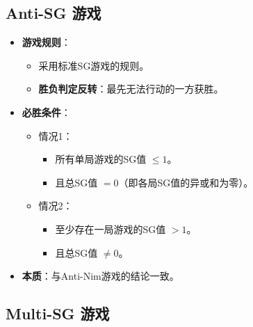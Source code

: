 \documentclass[a4paper,12pt]{article}
\begin{document}
\subsection{Anti-SG 游戏}

\begin{itemize}
    \item \textbf{游戏规则}：
    \begin{itemize}
        \item 采用标准SG游戏的规则。
        \item \textbf{胜负判定反转}：最先无法行动的一方获胜。
    \end{itemize}
    
    \item \textbf{必胜条件}：
    \begin{itemize}
        \item 情况1：
        \begin{itemize}
            \item 所有单局游戏的SG值 $\leq 1$。
            \item 且总SG值 $= 0$（即各局SG值的异或和为零）。
        \end{itemize}
        
        \item 情况2：
        \begin{itemize}
            \item 至少存在一局游戏的SG值 $> 1$。
            \item 且总SG值 $\neq 0$。
        \end{itemize}
    \end{itemize}
    
    \item \textbf{本质}：与Anti-Nim游戏的结论一致。
\end{itemize}

\subsection{Multi-SG 游戏}
\end{document}
